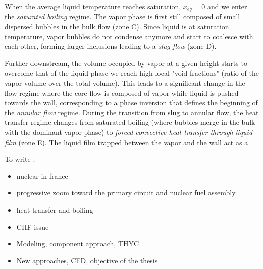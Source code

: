 \npar

When the average liquid temperature reaches saturation, $x_{eq} = 0 $ and we enter the \textit{saturated boiling} regime. The vapor phase is first still composed of small dispersed bubbles in the bulk flow (zone C). Since liquid is at saturation temperature, vapor bubbles do not condense anymore and start to coalesce with each other, forming larger inclusions leading to a \textit{slug flow} (zone D).

\npar

Further downstream, the volume occupied by vapor at a given height starts to overcome that of the liquid phase \ie we reach high local "void fractions" (ratio of the vapor volume over the total volume). This leads to a significant change in the flow regime where the core flow is composed of vapor while liquid is pushed towards the wall, corresponding to a phase inversion that defines the beginning of the \textit{annular flow} regime. During the transition from slug to annular flow, the heat transfer regime changes from saturated boiling (where bubbles merge in the bulk with the dominant vapor phase) to \textit{forced convective heat transfer through liquid film} (zone E). The liquid film trapped between the vapor and the wall act as a 






To write :

\begin{itemize}
\item nuclear in france
\item progressive zoom toward the primary circuit and nuclear fuel assembly
\item heat transfer and boiling
\item CHF issue
\item Modeling, component approach, THYC
\item New approaches, CFD, objective of the thesis
\end{itemize}
